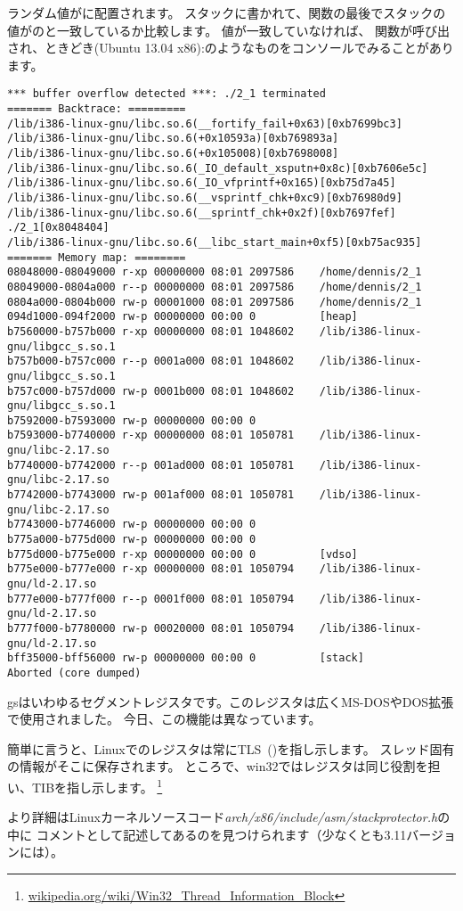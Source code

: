 ランダム値がに配置されます。
スタックに書かれて、関数の最後でスタックの値がのと一致しているか比較します。
値が一致していなければ、
関数が呼び出され、ときどき(Ubuntu 13.04 x86):のようなものをコンソールでみることがあります。

\begin{lstlisting}
*** buffer overflow detected ***: ./2_1 terminated
======= Backtrace: =========
/lib/i386-linux-gnu/libc.so.6(__fortify_fail+0x63)[0xb7699bc3]
/lib/i386-linux-gnu/libc.so.6(+0x10593a)[0xb769893a]
/lib/i386-linux-gnu/libc.so.6(+0x105008)[0xb7698008]
/lib/i386-linux-gnu/libc.so.6(_IO_default_xsputn+0x8c)[0xb7606e5c]
/lib/i386-linux-gnu/libc.so.6(_IO_vfprintf+0x165)[0xb75d7a45]
/lib/i386-linux-gnu/libc.so.6(__vsprintf_chk+0xc9)[0xb76980d9]
/lib/i386-linux-gnu/libc.so.6(__sprintf_chk+0x2f)[0xb7697fef]
./2_1[0x8048404]
/lib/i386-linux-gnu/libc.so.6(__libc_start_main+0xf5)[0xb75ac935]
======= Memory map: ========
08048000-08049000 r-xp 00000000 08:01 2097586    /home/dennis/2_1
08049000-0804a000 r--p 00000000 08:01 2097586    /home/dennis/2_1
0804a000-0804b000 rw-p 00001000 08:01 2097586    /home/dennis/2_1
094d1000-094f2000 rw-p 00000000 00:00 0          [heap]
b7560000-b757b000 r-xp 00000000 08:01 1048602    /lib/i386-linux-gnu/libgcc_s.so.1
b757b000-b757c000 r--p 0001a000 08:01 1048602    /lib/i386-linux-gnu/libgcc_s.so.1
b757c000-b757d000 rw-p 0001b000 08:01 1048602    /lib/i386-linux-gnu/libgcc_s.so.1
b7592000-b7593000 rw-p 00000000 00:00 0
b7593000-b7740000 r-xp 00000000 08:01 1050781    /lib/i386-linux-gnu/libc-2.17.so
b7740000-b7742000 r--p 001ad000 08:01 1050781    /lib/i386-linux-gnu/libc-2.17.so
b7742000-b7743000 rw-p 001af000 08:01 1050781    /lib/i386-linux-gnu/libc-2.17.so
b7743000-b7746000 rw-p 00000000 00:00 0
b775a000-b775d000 rw-p 00000000 00:00 0
b775d000-b775e000 r-xp 00000000 00:00 0          [vdso]
b775e000-b777e000 r-xp 00000000 08:01 1050794    /lib/i386-linux-gnu/ld-2.17.so
b777e000-b777f000 r--p 0001f000 08:01 1050794    /lib/i386-linux-gnu/ld-2.17.so
b777f000-b7780000 rw-p 00020000 08:01 1050794    /lib/i386-linux-gnu/ld-2.17.so
bff35000-bff56000 rw-p 00000000 00:00 0          [stack]
Aborted (core dumped)
\end{lstlisting}

gsはいわゆるセグメントレジスタです。このレジスタは広くMS-DOSやDOS拡張で使用されました。
今日、この機能は異なっています。

簡単に言うと、Linuxでのレジスタは常に\ac{TLS}~()を指し示します。
スレッド固有の情報がそこに保存されます。
ところで、win32ではレジスタは同じ役割を担い、\ac{TIB}を指し示します。
\footnote{\href{http://go.yurichev.com/17104}{wikipedia.org/wiki/Win32\_Thread\_Information\_Block}}

より詳細はLinuxカーネルソースコード\emph{arch/x86/include/asm/stackprotector.h}の中に
コメントとして記述してあるのを見つけられます（少なくとも3.11バージョンには）。


